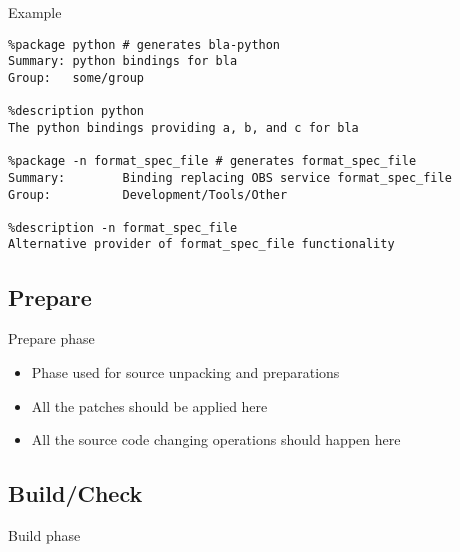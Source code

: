 \documentclass{beamer}
\begin{document}
\begin{frame}[fragile]{Example}
	\begin{small}
	\begin{verbatim}
%package python # generates bla-python
Summary: python bindings for bla
Group:   some/group

%description python
The python bindings providing a, b, and c for bla

%package -n format_spec_file # generates format_spec_file
Summary:        Binding replacing OBS service format_spec_file
Group:          Development/Tools/Other

%description -n format_spec_file
Alternative provider of format_spec_file functionality
	\end{verbatim}
	\end{small}
\end{frame}

\subsection{Prepare}

\begin{frame}[t]{Prepare phase}
	\begin{itemize}
	\item Phase used for source unpacking and preparations
    \item All the patches should be applied here
    \item All the source code changing operations should happen here
	\end{itemize}
\end{frame}

\subsection{Build/Check}

\begin{frame}[fragile]{Build phase}
\end{frame}
\end{document}
